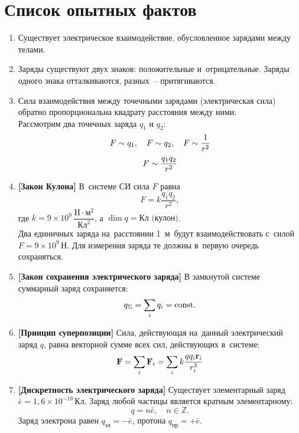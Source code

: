\section{Список опытных фактов}

	\begin{enumerate}
		\item Существует электрическое взаимодействие, обусловленное зарядами между телами.
		\item Заряды  существуют двух знаков: положительные и~отрицательные. Заряды одного знака отталкиваются, разных~-- притягиваются.
		\item Сила взаимодействия между точечными зарядами (электрическая сила)  обратно пропорциональна квадрату расстояния между ними. \\
				Рассмотрим два точечных заряда $q_1$ и $q_2$:
					$$F \prop q_1, \quad F \prop q_2, \quad F \prop \frac{1}{r^2}$$
					$$F \prop \frac{q_1q_2}{r^2}$$
		\item \textbf{[Закон Кулона]} В~системе СИ сила $F$ равна
				\begin{equation}\label{1}
					F=k\frac{q_1q_2}{r^2},
				\end{equation}
				где $k=9 \times 10^9 \,\dfrac{\text{H}\cdot \text{м}^2}{\text{Кл}^2}$, а $\dim{q}=\text{Кл (кулон)}$. \\
				Два единичных заряда на~расстоянии 1~м~будут взаимодействовать с~силой $F=9\times 10^9 \, \text{Н}$. Для измерения заряда те должны в~первую очередь сохраняться.
		\item \textbf{[Закон сохранения электрического заряда]} В замкнутой системе  суммарный заряд сохраняется:
					$$q_{\Sigma}=\sum_i q_i=\c.$$
		\item \textbf{[Принцип суперпозиции]} Сила, действующая на~данный электрический заряд $q$, равна векторной сумме всех сил, действующих в~системе:
				\begin{equation}\label{2}
					\vec{F} = \sum_i \vec{F}_i = \sum_i k\frac{qq_i\vec{r}_i}{r_i^3} \\
				\end{equation} 
		\item \textbf{[Дискретность электрического заряда]} Существует элементарный заряд $\bar{e}=1,6 \times 10^{-19} \, \text{Кл}$. Заряд любой частицы является кратным элементарному:
					$$q=n\bar{e}, \quad n \in \mathbb{Z}.$$
					Заряд электрона равен $q_{\text{эл}}=-\bar{e}$, протона $q_{\text{пр}}=+\bar{e}$.
	\end{enumerate}